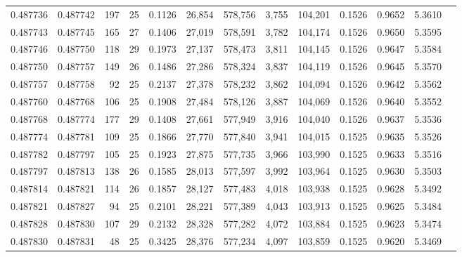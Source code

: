 \begin{tabular}{rrrrrrrrrrrrr}
0.487736 & 0.487742 & 197 &  25 &                                     0.1126 &  26,854 & 578,756 &   3,755 & 104,201 & 0.1526 & 0.9652 & 5.3610 \\
0.487743 & 0.487745 & 165 &  27 &                                     0.1406 &  27,019 & 578,591 &   3,782 & 104,174 & 0.1526 & 0.9650 & 5.3595 \\
0.487746 & 0.487750 & 118 &  29 &                                     0.1973 &  27,137 & 578,473 &   3,811 & 104,145 & 0.1526 & 0.9647 & 5.3584 \\
0.487750 & 0.487757 & 149 &  26 &                                     0.1486 &  27,286 & 578,324 &   3,837 & 104,119 & 0.1526 & 0.9645 & 5.3570 \\
0.487757 & 0.487758 &  92 &  25 &                                     0.2137 &  27,378 & 578,232 &   3,862 & 104,094 & 0.1526 & 0.9642 & 5.3562 \\
0.487760 & 0.487768 & 106 &  25 &                                     0.1908 &  27,484 & 578,126 &   3,887 & 104,069 & 0.1526 & 0.9640 & 5.3552 \\
0.487768 & 0.487774 & 177 &  29 &                                     0.1408 &  27,661 & 577,949 &   3,916 & 104,040 & 0.1526 & 0.9637 & 5.3536 \\
0.487774 & 0.487781 & 109 &  25 &                                     0.1866 &  27,770 & 577,840 &   3,941 & 104,015 & 0.1525 & 0.9635 & 5.3526 \\
0.487782 & 0.487797 & 105 &  25 &                                     0.1923 &  27,875 & 577,735 &   3,966 & 103,990 & 0.1525 & 0.9633 & 5.3516 \\
0.487797 & 0.487813 & 138 &  26 &                                     0.1585 &  28,013 & 577,597 &   3,992 & 103,964 & 0.1525 & 0.9630 & 5.3503 \\
0.487814 & 0.487821 & 114 &  26 &                                     0.1857 &  28,127 & 577,483 &   4,018 & 103,938 & 0.1525 & 0.9628 & 5.3492 \\
0.487821 & 0.487827 &  94 &  25 &                                     0.2101 &  28,221 & 577,389 &   4,043 & 103,913 & 0.1525 & 0.9625 & 5.3484 \\
0.487828 & 0.487830 & 107 &  29 &                                     0.2132 &  28,328 & 577,282 &   4,072 & 103,884 & 0.1525 & 0.9623 & 5.3474 \\
0.487830 & 0.487831 &  48 &  25 &                                     0.3425 &  28,376 & 577,234 &   4,097 & 103,859 & 0.1525 & 0.9620 & 5.3469 \\

\end{tabular}
